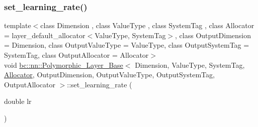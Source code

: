 \mbox{\label{structbc_1_1nn_1_1Polymorphic__Layer__Base_a9ca5f068a02a1b132d8a90e2c307b4d9}} 
\subsubsection{\texorpdfstring{set\+\_\+learning\+\_\+rate()}{set\_learning\_rate()}\hspace{0.1cm}{\footnotesize\ttfamily [1/2]}}
{\footnotesize\ttfamily template$<$class Dimension , class Value\+Type , class System\+Tag , class Allocator  = layer\+\_\+default\+\_\+allocator$<$\+Value\+Type, System\+Tag$>$, class Output\+Dimension  = Dimension, class Output\+Value\+Type  = Value\+Type, class Output\+System\+Tag  = System\+Tag, class Output\+Allocator  = Allocator$>$ \\
void \hyperlink{structbc_1_1nn_1_1Polymorphic__Layer__Base}{bc\+::nn\+::\+Polymorphic\+\_\+\+Layer\+\_\+\+Base}$<$ Dimension, Value\+Type, System\+Tag, \hyperlink{classbc_1_1allocators_1_1Allocator}{Allocator}, Output\+Dimension, Output\+Value\+Type, Output\+System\+Tag, Output\+Allocator $>$\+::set\+\_\+learning\+\_\+rate (\begin{DoxyParamCaption}\item[{double}]{lr }\end{DoxyParamCaption})\hspace{0.3cm}{\ttfamily [inline]}}

\mbox{\label{structbc_1_1nn_1_1Polymorphic__Layer__Base_a9ca5f068a02a1b132d8a90e2c307b4d9}} 
